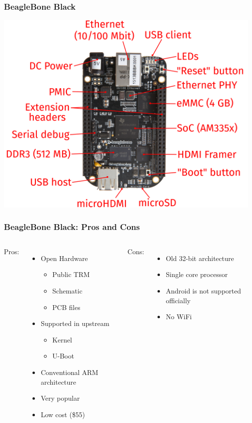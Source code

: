 \documentclass[aspectratio=169]{beamer}
\begin{document}
\begin{frame}
  \frametitle{BeagleBone Black}
  \begin{center}
    \includegraphics[scale=0.82]{images/bbb02.png}
  \end{center}
\end{frame}

\begin{frame}
  \frametitle{BeagleBone Black: Pros and Cons}
  \begin{columns}[t]
    Pros:
    \begin{itemize}
    \item Open Hardware
      \begin{itemize}
      \item Public TRM
      \item Schematic
      \item PCB files
      \end{itemize}
    \item Supported in upstream
      \begin{itemize}
      \item Kernel
      \item U-Boot
      \end{itemize}
    \item Conventional ARM architecture
    \item Very popular
    \item Low cost (\$55)
    \end{itemize}

    Cons:
    \begin{itemize}
    \item Old 32-bit architecture
    \item Single core processor
    \item Android is not supported officially
    \item No WiFi
    \end{itemize}
  \end{columns}
\end{frame}
\end{document}
